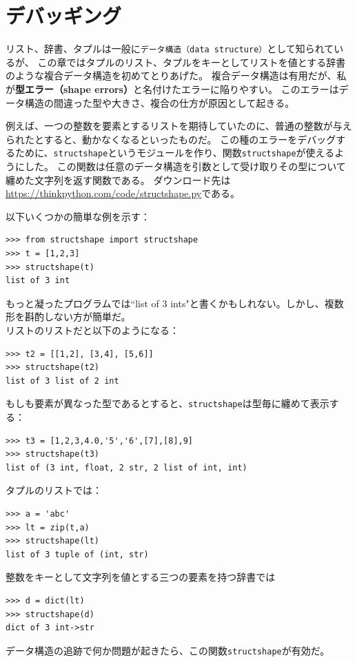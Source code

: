 \documentclass[a4j,12pt,makeidx]{jbook}
\begin{document}
\section{デバッギング}
リスト、辞書、タプルは一般に{\tt データ構造（data structure）}として知られているが、
この章ではタプルのリスト、タプルをキーとしてリストを値とする辞書のような複合データ構造を初めてとりあげた。
複合データ構造は有用だが、私が{\bf 型エラー（shape errors）}と名付けたエラーに陥りやすい。
このエラーはデータ構造の間違った型や大きさ、複合の仕方が原因として起きる。\par
例えば、一つの整数を要素とするリストを期待していたのに、普通の整数が与えられたとすると、動かなくなるといったものだ。
この種のエラーをデバッグするために、{\tt structshape}というモジュールを作り、関数{\tt structshape}が使えるようにした。
この関数は任意のデータ構造を引数として受け取りその型について纏めた文字列を返す関数である。
ダウンロード先は\url{https://thinkpython.com/code/structshape.py}である。\par
以下いくつかの簡単な例を示す：
\begin{verbatim}
>>> from structshape import structshape
>>> t = [1,2,3]
>>> structshape(t)
list of 3 int
\end{verbatim}
もっと凝ったプログラムでは``list of 3 ints"と書くかもしれない。しかし、複数形を斟酌しない方が簡単だ。\\
リストのリストだと以下のようになる：
\begin{verbatim}
>>> t2 = [[1,2], [3,4], [5,6]]
>>> structshape(t2)
list of 3 list of 2 int
\end{verbatim}
もしも要素が異なった型であるとすると、{\tt structshape}は型毎に纏めて表示する：
\begin{verbatim}
>>> t3 = [1,2,3,4.0,'5','6',[7],[8],9]
>>> structshape(t3)
list of (3 int, float, 2 str, 2 list of int, int)
\end{verbatim}
タプルのリストでは：
\begin{verbatim}
>>> a = 'abc'
>>> lt = zip(t,a)
>>> structshape(lt)
list of 3 tuple of (int, str)
\end{verbatim}
整数をキーとして文字列を値とする三つの要素を持つ辞書では
\begin{verbatim}
>>> d = dict(lt)
>>> structshape(d)
dict of 3 int->str
\end{verbatim}
データ構造の追跡で何か問題が起きたら、この関数{\tt structshape}が有効だ。
%
\end{document}
